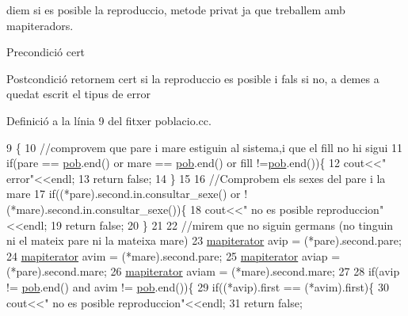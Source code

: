 diem si es posible la reproduccio, metode privat ja que treballem amb mapiteradors. 

\begin{DoxyPrecond}{Precondició}
cert 
\end{DoxyPrecond}
\begin{DoxyPostcond}{Postcondició}
retornem cert si la reproduccio es posible i fals si no, a demes a quedat escrit el tipus de error 
\end{DoxyPostcond}


Definició a la línia 9 del fitxer poblacio.\+cc.


\begin{DoxyCode}
9                                                                                       \{
10     \textcolor{comment}{//comprovem que pare i mare estiguin al sistema,i que el fill no hi sigui}
11     \textcolor{keywordflow}{if}(pare == \hyperlink{classpoblacio_a7ecb70033b151a937143b07d489c4c17}{pob}.end() or mare == \hyperlink{classpoblacio_a7ecb70033b151a937143b07d489c4c17}{pob}.end() or fill !=\hyperlink{classpoblacio_a7ecb70033b151a937143b07d489c4c17}{pob}.end())\{
12       cout<<\textcolor{stringliteral}{"  error"}<<endl;
13       \textcolor{keywordflow}{return} \textcolor{keyword}{false};
14     \}
15 
16     \textcolor{comment}{//Comprobem els sexes del pare i la mare}
17     \textcolor{keywordflow}{if}((*pare).second.in.consultar\_sexe() or !(*mare).second.in.consultar\_sexe())\{
18       cout<<\textcolor{stringliteral}{"  no es posible reproduccion"}<<endl;
19       \textcolor{keywordflow}{return} \textcolor{keyword}{false};
20     \}
21 
22     \textcolor{comment}{//mirem que no siguin germans (no tinguin ni el mateix pare ni la mateixa mare)}
23     \hyperlink{classpoblacio_a52c3d96b08f7679f27487e7499185ed1}{mapiterator} avip = (*pare).second.pare;
24     \hyperlink{classpoblacio_a52c3d96b08f7679f27487e7499185ed1}{mapiterator} avim = (*mare).second.pare;
25     \hyperlink{classpoblacio_a52c3d96b08f7679f27487e7499185ed1}{mapiterator} aviap = (*pare).second.mare;
26     \hyperlink{classpoblacio_a52c3d96b08f7679f27487e7499185ed1}{mapiterator} aviam = (*mare).second.mare;
27 
28     \textcolor{keywordflow}{if}(avip != \hyperlink{classpoblacio_a7ecb70033b151a937143b07d489c4c17}{pob}.end() and avim != \hyperlink{classpoblacio_a7ecb70033b151a937143b07d489c4c17}{pob}.end())\{
29       \textcolor{keywordflow}{if}((*avip).first == (*avim).first)\{
30         cout<<\textcolor{stringliteral}{"  no es posible reproduccion"}<<endl;
31         \textcolor{keywordflow}{return} \textcolor{keyword}{false};

\end{DoxyCode}
